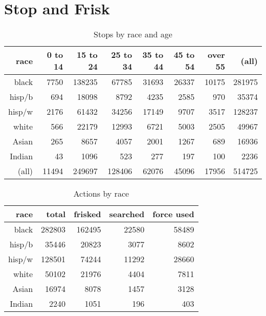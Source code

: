 \documentclass[letterpaper]{exam}
\begin{document}
  \section{Stop and Frisk}

  \begin{table}[H]
    \centering
    \begin{tabular}{rrrrrrrr}
      \toprule
       race    & 0 to 14 & 15 to 24 & 25 to 34 & 35 to 44 & 45 to 54 & over 55 & (all) \\
      \midrule
      black    & 7750    & 138235   & 67785    & 31693    & 26337    & 10175   & 281975 \\
      hisp/b   & 694     & 18098    & 8792     & 4235     & 2585     & 970     & 35374 \\
      hisp/w   & 2176    & 61432    & 34256    & 17149    & 9707     & 3517    & 128237 \\
      white    & 566     & 22179    & 12993    & 6721     & 5003     & 2505    & 49967 \\
      Asian    & 265     & 8657     & 4057     & 2001     & 1267     & 689     & 16936 \\
      Indian   & 43      & 1096     & 523      & 277      & 197      & 100     & 2236 \\
      (all)    & 11494   & 249697   & 128406   & 62076    & 45096    & 17956   & 514725 \\
      \bottomrule
    \end{tabular}
    \caption{Stops by race and age}
  \end{table}

  \begin{table}[H]
    \centering
    \begin{tabular}{rrrrr}
      \toprule
      race     & total  & frisked & searched & force used \\
      \midrule
      black    & 282803 & 162495  & 22580    & 58489 \\
      hisp/b   & 35446  & 20823   & 3077     & 8602 \\
      hisp/w   & 128501 & 74244   & 11292    & 28660 \\
      white    & 50102  & 21976   & 4404     & 7811 \\
      Asian    & 16974  & 8078    & 1457     & 3128 \\
      Indian   & 2240   & 1051    & 196      & 403 \\
      \bottomrule
    \end{tabular}
    \caption{Actions by race}
  \end{table}
\end{document}
